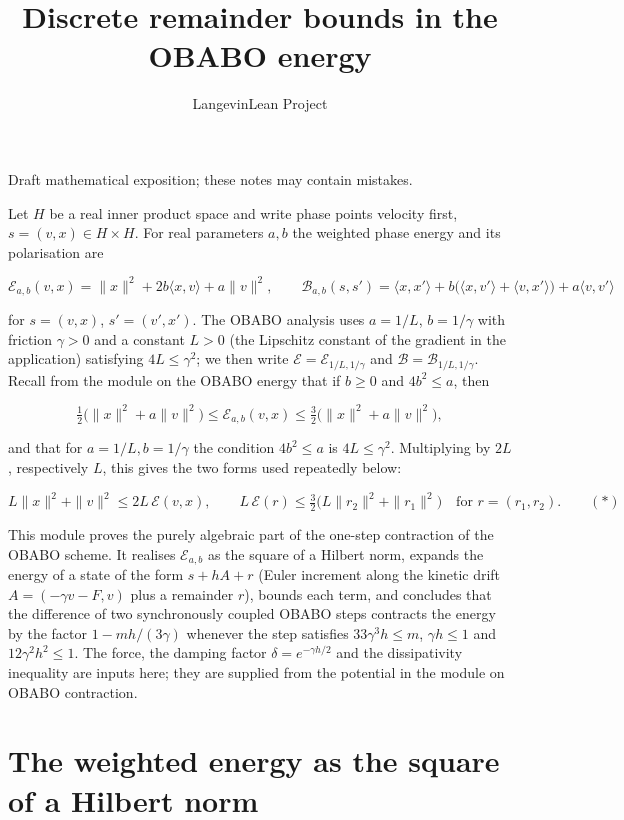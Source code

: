\documentclass[11pt,a4paper]{article}
\title{\texorpdfstring{Discrete remainder bounds in the OBABO energy}{Discrete remainder bounds in the OBABO energy}}
\author{LangevinLean Project}
\date{}
\begin{document}
\maketitle
Draft mathematical exposition; these notes may contain mistakes.


Let \(H\) be a real inner product space and write phase points velocity first, \(s=(v,x)\in H\times H\). For real parameters \(a,b\) the weighted phase energy and its polarisation are


\[\mathcal E_{a,b}(v,x)=\|x\|^2+2b\langle x,v\rangle+a\|v\|^2,\qquad \mathcal B_{a,b}(s,s')=\langle x,x'\rangle+b\bigl(\langle x,v'\rangle+\langle v,x'\rangle\bigr)+a\langle v,v'\rangle\]


for \(s=(v,x)\), \(s'=(v',x')\). The OBABO analysis uses \(a=1/L\), \(b=1/\gamma\) with friction \(\gamma>0\) and a constant \(L>0\) (the Lipschitz constant of the gradient in the application) satisfying \(4L\le\gamma^2\); we then write \(\mathcal E=\mathcal E_{1/L,1/\gamma}\) and \(\mathcal B=\mathcal B_{1/L,1/\gamma}\). Recall from the module on the OBABO energy that if \(b\ge0\) and \(4b^2\le a\), then


\[\tfrac12\bigl(\|x\|^2+a\|v\|^2\bigr)\le\mathcal E_{a,b}(v,x)\le\tfrac32\bigl(\|x\|^2+a\|v\|^2\bigr),\]


and that for \(a=1/L,b=1/\gamma\) the condition \(4b^2\le a\) is \(4L\le\gamma^2\). Multiplying by \(2L\), respectively \(L\), this gives the two forms used repeatedly below:


\[L\|x\|^2+\|v\|^2\le2L\,\mathcal E(v,x),\qquad L\,\mathcal E(r)\le\tfrac32\bigl(L\|r_2\|^2+\|r_1\|^2\bigr)\quad\text{for }r=(r_1,r_2).\qquad(\ast)\]


This module proves the purely algebraic part of the one-step contraction of the OBABO scheme. It realises \(\mathcal E_{a,b}\) as the square of a Hilbert norm, expands the energy of a state of the form \(s+hA+r\) (Euler increment along the kinetic drift \(A=(-\gamma v-F,v)\) plus a remainder \(r\)), bounds each term, and concludes that the difference of two synchronously coupled OBABO steps contracts the energy by the factor \(1-mh/(3\gamma)\) whenever the step satisfies \(33\gamma^3h\le m\), \(\gamma h\le1\) and \(12\gamma^2h^2\le1\). The force, the damping factor \(\delta=e^{-\gamma h/2}\) and the dissipativity inequality are inputs here; they are supplied from the potential in the module on OBABO contraction.


\section{\texorpdfstring{The weighted energy as the square of a Hilbert norm}{The weighted energy as the square of a Hilbert norm}}
\end{document}
